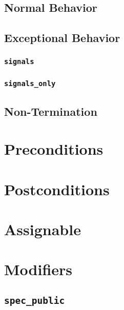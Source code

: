 \documentclass[a4paper, 11pt, accentcolor = tud3b]{tudreport}
\begin{document}
			\subsection{Normal Behavior} %

			\subsection{Exceptional Behavior} %

				\subsubsection{\texttt{signals}} %

				\subsubsection{\texttt{signals\_only} } %

			\subsection{Non-Termination} %

		\section{Preconditions} %

		\section{Postconditions} %

		\section{Assignable} %

		\section{Modifiers} %

			\subsection{\texttt{spec\_public}} %
\end{document}

